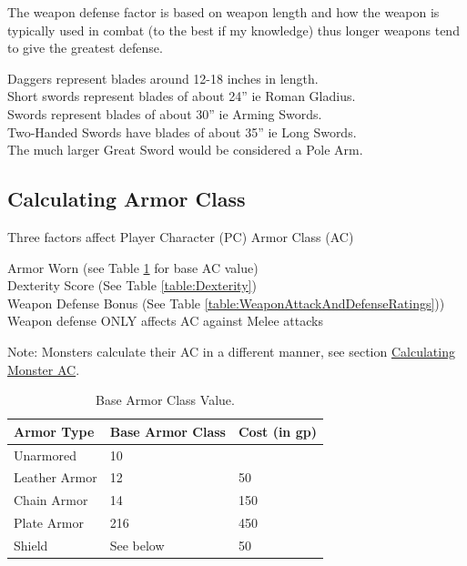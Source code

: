 \documentclass[letterpaper,sansserif,tightsqueeze]{rpg-module}
\begin{document}
The weapon defense factor is based on weapon length and how the weapon is typically used in combat (to the best if my knowledge) thus longer weapons tend to give the greatest defense.

Daggers represent blades around 12-18 inches in length.\\
Short swords represent blades of about 24” ie Roman Gladius.\\
Swords represent blades of about 30” ie Arming Swords.\\
Two-Handed Swords have blades of about 35” ie Long Swords.\\
The much larger Great Sword would be considered a Pole Arm.

\vspace{0.5cm}

\subsection*{Calculating Armor Class}
Three factors affect Player Character (PC) Armor Class (AC)

Armor Worn (see Table \ref{table:BaseArmorClassValue} for base AC value)\\
Dexterity Score (See Table \ref{table:Dexterity})\\
Weapon Defense Bonus (See Table \ref{table:WeaponAttackAndDefenseRatings}))\\
Weapon defense ONLY affects AC against Melee attacks

Note: Monsters calculate their AC in a different manner, see section \hyperref[subsection:MonsterAC]{Calculating Monster AC}.

\begin{table}[h!]
	\centering
	\begin{tabular}{|l|l|l|}
		\hline
		\textbf{Armor Type}    & \textbf{Base Armor Class} & \textbf{Cost (in gp)} \\ \hline
		Unarmored     & 10               &              \\ \hline
		Leather Armor & 12               & 50           \\ \hline
		Chain Armor   & 14               & 150          \\ \hline
		Plate Armor   & 216              & 450          \\ \hline
		Shield        & See below        & 50           \\ \hline
	\end{tabular}
	\caption{Base Armor Class Value.}
	\label{table:BaseArmorClassValue}
\end{table}
\end{document}
